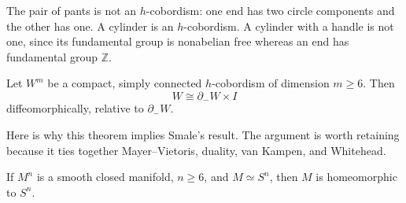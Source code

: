 \begin{example}
\label{at-example-non-h-cobordisms}
The pair of pants is not an $h$-cobordism:
one end has two circle components and the
other has one.  A cylinder is an
$h$-cobordism.  A cylinder with a handle is
not one, since its fundamental group is
nonabelian free whereas an end has
fundamental
group $\mathbb{Z}$.
\end{example}

\begin{theorem}
\label{at-theorem-h-cobordism}
Let $W^m$ be a compact, simply connected
$h$-cobordism of dimension $m\geq6$.  Then
$$
W\cong\partial_-W\times I
$$
diffeomorphically, relative to
$\partial_-W$.
\end{theorem}

Here is why this theorem implies Smale's
result.  The argument is worth retaining
because it ties together Mayer--Vietoris,
duality, van Kampen, and Whitehead.

\begin{theorem}[Smale]
\label{at-theorem-smale-from-h-cobordism}
If $M^n$ is a smooth closed manifold,
$n\geq6$, and $M\simeq S^n$, then $M$ is
homeomorphic to $S^n$.
\end{theorem}

